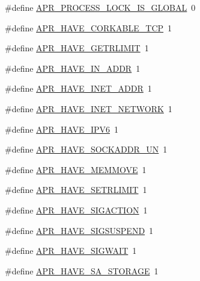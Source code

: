 \begin{DoxyCompactItemize}
\item 
\#define \hyperlink{group__apr__platform_ga2faf50198d02b5f6e21c32429ca1c5b4}{A\+P\+R\+\_\+\+P\+R\+O\+C\+E\+S\+S\+\_\+\+L\+O\+C\+K\+\_\+\+I\+S\+\_\+\+G\+L\+O\+B\+AL}~0
\item 
\#define \hyperlink{group__apr__platform_gab841a4b1a92684a089fbab9e7bce737a}{A\+P\+R\+\_\+\+H\+A\+V\+E\+\_\+\+C\+O\+R\+K\+A\+B\+L\+E\+\_\+\+T\+CP}~1
\item 
\#define \hyperlink{group__apr__platform_ga58025dd20776cbc5a5e7a18f1ac6d5ad}{A\+P\+R\+\_\+\+H\+A\+V\+E\+\_\+\+G\+E\+T\+R\+L\+I\+M\+IT}~1
\item 
\#define \hyperlink{group__apr__platform_ga2713eb83fc527f0b262b58c0c449cdcb}{A\+P\+R\+\_\+\+H\+A\+V\+E\+\_\+\+I\+N\+\_\+\+A\+D\+DR}~1
\item 
\#define \hyperlink{group__apr__platform_ga0c38cccb121e483045a2564bb1ae61ec}{A\+P\+R\+\_\+\+H\+A\+V\+E\+\_\+\+I\+N\+E\+T\+\_\+\+A\+D\+DR}~1
\item 
\#define \hyperlink{group__apr__platform_gaadacfca3c1cbae0447c1b4d4ea499d57}{A\+P\+R\+\_\+\+H\+A\+V\+E\+\_\+\+I\+N\+E\+T\+\_\+\+N\+E\+T\+W\+O\+RK}~1
\item 
\#define \hyperlink{group__apr__platform_gab42a2abcd9e58a79b4bf40e8f02e57a2}{A\+P\+R\+\_\+\+H\+A\+V\+E\+\_\+\+I\+P\+V6}~1
\item 
\#define \hyperlink{group__apr__platform_ga815a8c820a633dd448110f1727aa6cf2}{A\+P\+R\+\_\+\+H\+A\+V\+E\+\_\+\+S\+O\+C\+K\+A\+D\+D\+R\+\_\+\+UN}~1
\item 
\#define \hyperlink{group__apr__platform_ga0aff7b8d78dc6cea94892a3738bc0edf}{A\+P\+R\+\_\+\+H\+A\+V\+E\+\_\+\+M\+E\+M\+M\+O\+VE}~1
\item 
\#define \hyperlink{group__apr__platform_ga4a858c53da127087a9bef6105531ce54}{A\+P\+R\+\_\+\+H\+A\+V\+E\+\_\+\+S\+E\+T\+R\+L\+I\+M\+IT}~1
\item 
\#define \hyperlink{group__apr__platform_ga2ed59eb76fdfc4d332a1ef5583206f05}{A\+P\+R\+\_\+\+H\+A\+V\+E\+\_\+\+S\+I\+G\+A\+C\+T\+I\+ON}~1
\item 
\#define \hyperlink{group__apr__platform_ga661ccf871e31f9e8e4adc75dbfd67951}{A\+P\+R\+\_\+\+H\+A\+V\+E\+\_\+\+S\+I\+G\+S\+U\+S\+P\+E\+ND}~1
\item 
\#define \hyperlink{group__apr__platform_ga0117237934a6095a050a9d39ff152a26}{A\+P\+R\+\_\+\+H\+A\+V\+E\+\_\+\+S\+I\+G\+W\+A\+IT}~1
\item 
\#define \hyperlink{group__apr__platform_ga57c4c6c8a22aeef21db29093f2f648f9}{A\+P\+R\+\_\+\+H\+A\+V\+E\+\_\+\+S\+A\+\_\+\+S\+T\+O\+R\+A\+GE}~1

\end{DoxyCompactItemize}
